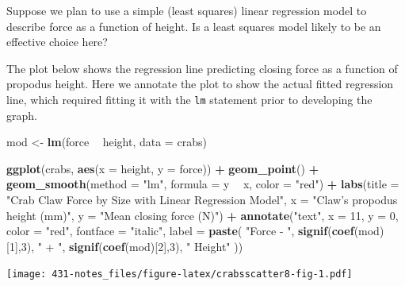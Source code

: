 \documentclass[
]{book}
\newenvironment{Shaded}{\begin{snugshade}}{\end{snugshade}}
\newcommand{\DataTypeTok}[1]{\textcolor[rgb]{0.13,0.29,0.53}{#1}}
\newcommand{\DecValTok}[1]{\textcolor[rgb]{0.00,0.00,0.81}{#1}}
\newcommand{\KeywordTok}[1]{\textcolor[rgb]{0.13,0.29,0.53}{\textbf{#1}}}
\newcommand{\NormalTok}[1]{#1}
\newcommand{\OperatorTok}[1]{\textcolor[rgb]{0.81,0.36,0.00}{\textbf{#1}}}
\newcommand{\StringTok}[1]{\textcolor[rgb]{0.31,0.60,0.02}{#1}}
\begin{document}
Suppose we plan to use a simple (least squares) linear regression model to describe force as a function of height. Is a least squares model likely to be an effective choice here?

The plot below shows the regression line predicting closing force as a function of propodus height. Here we annotate the plot to show the actual fitted regression line, which required fitting it with the \texttt{lm} statement prior to developing the graph.

\begin{Shaded}
\begin{Highlighting}[]
\NormalTok{mod <-}\StringTok{ }\KeywordTok{lm}\NormalTok{(force }\OperatorTok{~}\StringTok{ }\NormalTok{height, }\DataTypeTok{data =}\NormalTok{ crabs)}

\KeywordTok{ggplot}\NormalTok{(crabs, }\KeywordTok{aes}\NormalTok{(}\DataTypeTok{x =}\NormalTok{ height, }\DataTypeTok{y =}\NormalTok{ force)) }\OperatorTok{+}
\StringTok{    }\KeywordTok{geom_point}\NormalTok{() }\OperatorTok{+}
\StringTok{    }\KeywordTok{geom_smooth}\NormalTok{(}\DataTypeTok{method =} \StringTok{"lm"}\NormalTok{, }\DataTypeTok{formula =}\NormalTok{ y }\OperatorTok{~}\StringTok{ }\NormalTok{x,  }\DataTypeTok{color =} \StringTok{"red"}\NormalTok{) }\OperatorTok{+}
\StringTok{    }\KeywordTok{labs}\NormalTok{(}\DataTypeTok{title =} \StringTok{"Crab Claw Force by Size with Linear Regression Model"}\NormalTok{, }
         \DataTypeTok{x =} \StringTok{"Claw's propodus height (mm)"}\NormalTok{, }\DataTypeTok{y =} \StringTok{"Mean closing force (N)"}\NormalTok{) }\OperatorTok{+}
\StringTok{    }\KeywordTok{annotate}\NormalTok{(}\StringTok{"text"}\NormalTok{, }\DataTypeTok{x =} \DecValTok{11}\NormalTok{, }\DataTypeTok{y =} \DecValTok{0}\NormalTok{, }\DataTypeTok{color =} \StringTok{"red"}\NormalTok{, }\DataTypeTok{fontface =} \StringTok{"italic"}\NormalTok{,}
             \DataTypeTok{label =} \KeywordTok{paste}\NormalTok{( }\StringTok{"Force - "}\NormalTok{, }\KeywordTok{signif}\NormalTok{(}\KeywordTok{coef}\NormalTok{(mod)[}\DecValTok{1}\NormalTok{],}\DecValTok{3}\NormalTok{), }\StringTok{" + "}\NormalTok{, }
                            \KeywordTok{signif}\NormalTok{(}\KeywordTok{coef}\NormalTok{(mod)[}\DecValTok{2}\NormalTok{],}\DecValTok{3}\NormalTok{), }\StringTok{" Height"}\NormalTok{ ))}
\end{Highlighting}
\end{Shaded}

\texttt{[image: 431-notes\_files/figure-latex/crabsscatter8-fig-1.pdf]}
\end{document}
